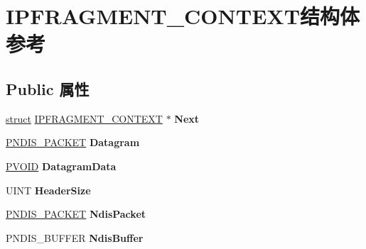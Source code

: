 \hypertarget{struct_i_p_f_r_a_g_m_e_n_t___c_o_n_t_e_x_t}{}\section{I\+P\+F\+R\+A\+G\+M\+E\+N\+T\+\_\+\+C\+O\+N\+T\+E\+X\+T结构体 参考}
\label{struct_i_p_f_r_a_g_m_e_n_t___c_o_n_t_e_x_t}
\subsection*{Public 属性}
\begin{DoxyCompactItemize}
\item 
\mbox{\label{struct_i_p_f_r_a_g_m_e_n_t___c_o_n_t_e_x_t_af143cbfd9a0025bdfed0bb36a7888bb0}} 
\hyperlink{interfacestruct}{struct} \hyperlink{struct_i_p_f_r_a_g_m_e_n_t___c_o_n_t_e_x_t}{I\+P\+F\+R\+A\+G\+M\+E\+N\+T\+\_\+\+C\+O\+N\+T\+E\+XT} $\ast$ {\bfseries Next}
\item 
\mbox{\label{struct_i_p_f_r_a_g_m_e_n_t___c_o_n_t_e_x_t_a6f14faf75cc700d1b84263b545b1c5bd}} 
\hyperlink{struct___n_d_i_s___p_a_c_k_e_t}{P\+N\+D\+I\+S\+\_\+\+P\+A\+C\+K\+ET} {\bfseries Datagram}
\item 
\mbox{\label{struct_i_p_f_r_a_g_m_e_n_t___c_o_n_t_e_x_t_ac7f7d6bce1089f6d25595703267f590d}} 
\hyperlink{interfacevoid}{P\+V\+O\+ID} {\bfseries Datagram\+Data}
\item 
\mbox{\label{struct_i_p_f_r_a_g_m_e_n_t___c_o_n_t_e_x_t_a95a29d5929a1c50daa2ffead33d41577}} 
U\+I\+NT {\bfseries Header\+Size}
\item 
\mbox{\label{struct_i_p_f_r_a_g_m_e_n_t___c_o_n_t_e_x_t_a6494cda058a9a714c4777d9aa744202d}} 
\hyperlink{struct___n_d_i_s___p_a_c_k_e_t}{P\+N\+D\+I\+S\+\_\+\+P\+A\+C\+K\+ET} {\bfseries Ndis\+Packet}
\item 
\mbox{\label{struct_i_p_f_r_a_g_m_e_n_t___c_o_n_t_e_x_t_ab05506f34f7e328a2f9b66f2de78f39b}} 
P\+N\+D\+I\+S\+\_\+\+B\+U\+F\+F\+ER {\bfseries Ndis\+Buffer}

\end{DoxyCompactItemize}
